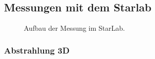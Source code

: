 \newpage
\subsection{Messungen mit dem Starlab}
\begin{figure}[h!]
	\centering
	\def\svgscale{0.75}
	
	\caption{Aufbau der Messung im StarLab.}
	\label{fig:LaptopimStarlab}
\end{figure}


\clearpage
\subsubsection{Abstrahlung 3D}

